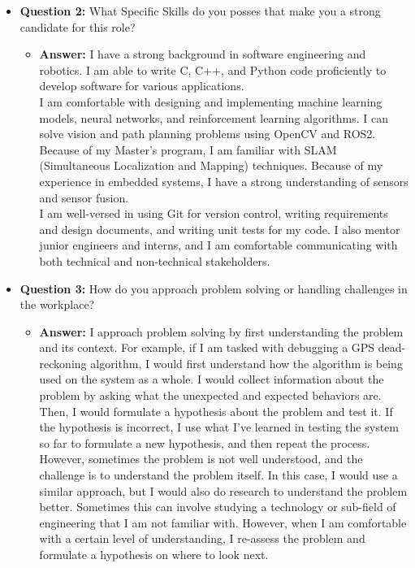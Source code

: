 \documentclass{article}
\begin{document}
\begin{itemize}
    \item \textbf{Question 2:} What Specific Skills do you posses that make you a strong candidate for this role?
    \begin{itemize}
        \item \textbf{Answer:} I have a strong background in software engineering
        and robotics. I am able to write C, C++, and Python code proficiently
        to develop software for various applications.\\

        I am comfortable with designing and implementing 
        machine learning models, 
        neural networks,
        and reinforcement learning algorithms. I can solve vision
        and path planning problems using OpenCV and ROS2. Because of
        my Master's program, I am familiar with SLAM (Simultaneous
        Localization and Mapping) techniques. Because of my experience 
        in embedded systems, I have
        a strong understanding of sensors and sensor fusion.\\

        I am well-versed in using Git for version control, writing
        requirements and design documents, and writing unit tests for my code.
        I also mentor junior engineers and interns, and I am comfortable
        communicating with both technical and non-technical stakeholders.
    \end{itemize}
    
    \item \textbf{Question 3:} How do you approach problem solving or handling challenges in the workplace?
    \begin{itemize}
        \item \textbf{Answer:} I approach problem solving by first
        understanding the problem and its context. For example, if I am tasked
        with debugging a GPS dead-reckoning algorithm, I would first
        understand how the algorithm is being used on the system as a whole.
        I would collect information about the problem by asking what the
        unexpected and expected behaviors are. Then, I would formulate a hypothesis about the problem and
        test it. If the hypothesis is incorrect, I use what I've learned
        in testing the system so far to formulate a new hypothesis, and
        then repeat the process.\\

        However, sometimes the problem is not well understood, and the
        challenge is to understand the problem itself. In this case,
        I would use a similar approach, but I would also do research
        to understand the problem better. Sometimes this can involve
        studying a technology or sub-field of engineering that I am
        not familiar with. However, when I am comfortable with a certain
        level of understanding, I re-assess the problem and formulate
        a hypothesis on where to look next.
    \end{itemize}
    

\end{itemize}
\end{document}

